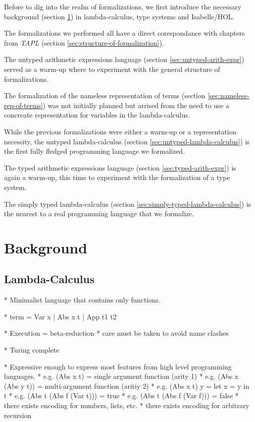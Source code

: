 \documentclass[a4paper, oneside, 12pt, titlepage]{article}
\begin{document}
Before to dig into the realm of formalizations, we first introduce the necessary background (section
\ref{sec:background}) in lambda-calculus, type systems and Isabelle/HOL.

The formalizations we performed all have a direct corespondance with chapters from \emph{TAPL}
(section \ref{sec:structure-of-formalization}).

The untyped arithmetic expressions language (section \ref{sec:untyped-arith-expr}) served as a
warm-up where to experiment with the general structure of formalizations.

The formalization of the nameless representation of terms (section \ref{sec:nameless-rep-of-terms})
was not initially planned but arrised from the need to use a concreate representation for variables
in the lambda-calculus.

While the previous formalizations were either a warm-up or a representation necessity, the untyped
lambda-calculus (section \ref{sec:untyped-lambda-calculus}) is the first fully fledged programming
language we formalized.

The typed arithmetic expressions language (section \ref{sec:typed-arith-expr}) is again a warm-up,
this time to experiment with the formalization of a type system.

The simply typed lambda-calculus (section \ref{sec:simply-typed-lambda-calculus}) is the nearest to
a real programming language that we formalize.

\section{Background}
\label{sec:background}

\subsection{Lambda-Calculus}

  * Minimalist language that contains only functions.

  * term = Var x | Abs x t | App t1 t2

  * Execution = beta-reduction
    * care must be taken to avoid name clashes

  * Turing complete

  * Expressive enough to express most features from high level programming languages.
    * e.g. (Abs x t) = single argument function (arity 1)
    * e.g. (Abs x (Abs y t)) = multi-argument function (aritiy 2)
    * e.g. (Abs x t) y = let x = y in t
    * e.g. (Abs t (Abs f (Var t))) = true
    * e.g. (Abs t (Abs f (Var f))) = false
    * there exists encoding for numbers, lists, etc.
    * there exists encoding for arbitrary recursion
\end{document}
